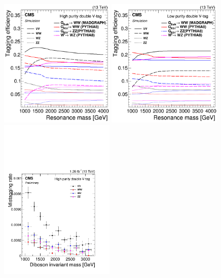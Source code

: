 \begin{figure}[h!]
\centering

\includegraphics[width=0.49\textwidth]{figures/analysis/search1/AN-15-211/HP_VV_SigEff.png}
\includegraphics[width=0.49\textwidth]{figures/analysis/search1/AN-15-211/LP_VV_SigEff.png}\\
\includegraphics[width=0.49\textwidth]{figures/analysis/search1/AN-15-211/QCD_HP_VV_MistaggingRateEff.pdf}

\end{figure}
